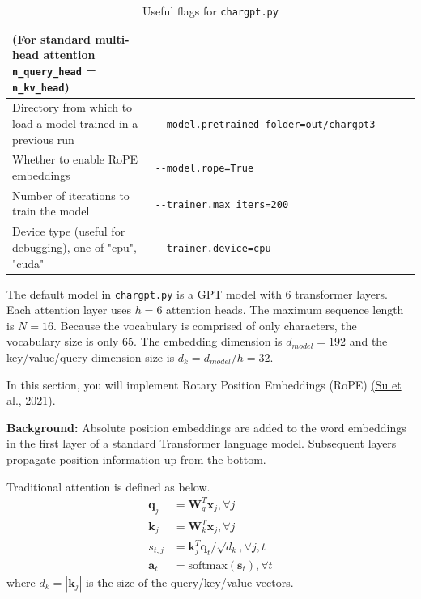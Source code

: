 \documentclass[11pt,addpoints,answers]{exam}
\newcommand{\av}{\mathbf{a}}
\newcommand{\kv}{\mathbf{k}}
\newcommand{\qv}{\mathbf{q}}
\newcommand{\sv}{\mathbf{s}}
\newcommand{\xv}{\mathbf{x}}
\newcommand{\Wv}{\mathbf{W}}
\begin{document}
\begin{questions}
\begin{table}[h!]
\begin{tabular}{|p{0.35\linewidth}|p{0.65\linewidth}|}
(For standard multi-head attention \lstinline|n_query_head| = \lstinline|n_kv_head|)\\ \hline
Directory from which to load a model trained in a previous run &  \lstinline|--model.pretrained_folder=out/chargpt3| \\ \hline
Whether to enable RoPE embeddings &  \lstinline|--model.rope=True| \\ \hline
Number of iterations to train the model & \lstinline|--trainer.max_iters=200| \\ \hline
Device type (useful for debugging), one of "cpu", "cuda"  & \lstinline|--trainer.device=cpu| \\ \hline
\end{tabular}
\caption{Useful flags for \lstinline{chargpt.py}}
\label{table:flag}
\end{table}


The default model in \lstinline{chargpt.py} is a GPT model with 6 transformer layers. Each attention layer uses $h=6$ attention heads. The maximum sequence length is $N=16$. Because the vocabulary is comprised of only characters, the vocabulary size is only 65. The embedding dimension is $d_{model} = 192$ and the key/value/query dimension size is $d_k = d_{model}/h =32$. 

\clearpage


    In this section, you will implement Rotary Position Embeddings (RoPE) \href{https://arxiv.org/pdf/2104.09864.pdf}{(Su et al., 2021)}. 


    \textbf{Background:}
    Absolute position embeddings are added to the word embeddings in the first layer of a standard Transformer language model. Subsequent layers propagate position information up from the bottom. 

    Traditional attention is defined as below.
    \begin{align*}
        \qv_j &= \Wv_q^T \xv_j, \forall j \\
        \kv_j &= \Wv_k^T \xv_j, \forall j \\
        s_{t,j} &= \kv_j^T \qv_t / \sqrt{d_k}, \forall j,t\\
        \av_t &= \text{softmax}(\sv_t), \forall t
    \end{align*}
    where $d_k = |\kv_j|$ is the size of the query/key/value vectors.


\end{questions}
\end{document}
